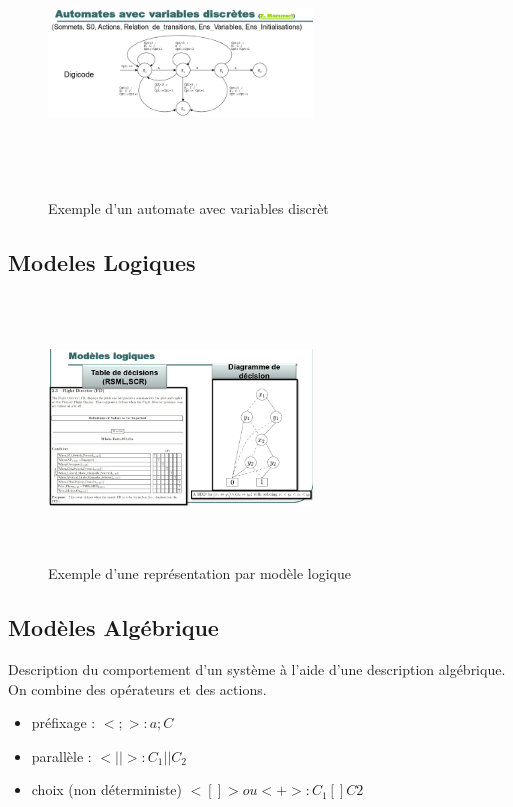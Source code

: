 \documentclass[oneside]{book}
\begin{document}
	\begin{figure}[!ht]
		\centering
		\includegraphics[width = 7cm, height = 7cm, keepaspectratio]{Images/automate_discret.png}
		\caption{Exemple d'un automate avec variables discrèt}
		\label{fig:AutomateDiscret}
	\end{figure}


    
    \subsection{Modeles Logiques}
    
    \begin{figure}[!ht]
    	\centering
    	\includegraphics[width = 7cm, height = 7cm, keepaspectratio]{Images/modele_logique.png}
    	\caption{Exemple d'une représentation par modèle logique}
    	\label{fig:ModeleLogique}
    \end{figure}
    
    \subsection{Modèles Algébrique}
    
    Description du comportement d'un système à l'aide d'une description algébrique. On combine des opérateurs et des actions.\\
    \begin{itemize}
    	\item préfixage : $<;>  : a ; C$
    	\item parallèle : $<\lvert\lvert> :C_1 \lvert\lvert C_2$
    	\item choix (non déterministe) $<[]> ou <+> : C_1 []C2$
    \end{itemize}
\end{document}
